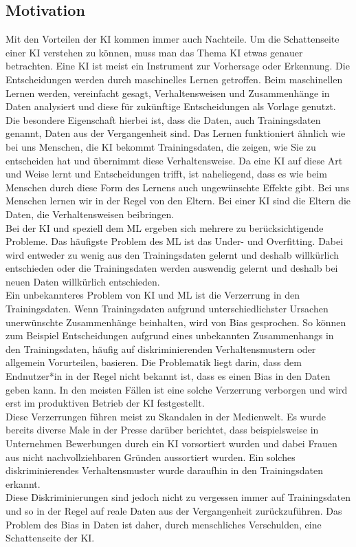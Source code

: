 \begin{onehalfspace}
    \newpage 
    \section{Motivation}
    \label{subsec:motivation}
    Mit den Vorteilen der \ac*{KI} kommen immer auch Nachteile. Um die Schattenseite einer \ac*{KI} verstehen zu können, muss man das Thema \ac*{KI} etwas genauer betrachten. Eine \ac*{KI} ist meist ein Instrument zur Vorhersage oder Erkennung. Die Entscheidungen werden durch maschinelles Lernen getroffen. Beim maschinellen Lernen werden, vereinfacht gesagt, Verhaltensweisen und Zusammenhänge in Daten analysiert und diese für zukünftige Entscheidungen als Vorlage genutzt. Die besondere Eigenschaft hierbei ist, dass die Daten, auch Trainingsdaten genannt, Daten aus der Vergangenheit sind. Das Lernen funktioniert ähnlich wie bei uns Menschen, die \ac*{KI} bekommt Trainingsdaten, die zeigen, wie Sie zu entscheiden hat und übernimmt diese Verhaltensweise. Da eine \ac*{KI} auf diese Art und Weise lernt und Entscheidungen trifft, ist naheliegend, dass es wie beim Menschen durch diese Form des Lernens auch ungewünschte Effekte gibt. Bei uns Menschen lernen wir in der Regel von den Eltern. Bei einer \ac*{KI} sind die Eltern die Daten, die Verhaltensweisen beibringen.\cite{Döbel2018}
        \\
        Bei der \ac*{KI} und speziell dem \ac{ML} ergeben sich mehrere zu berücksichtigende Probleme. Das häufigste Problem des \ac*{ML} ist das Under- und Overfitting. Dabei wird entweder zu wenig aus den Trainingsdaten gelernt und deshalb willkürlich entschieden oder die Trainingsdaten werden \glqq{}auswendig\grqq{} gelernt und deshalb bei neuen Daten willkürlich entschieden.\cite{Horn2022}
        \\
        Ein unbekannteres Problem von \ac*{KI} und \ac*{ML} ist die Verzerrung in den Trainingsdaten. Wenn Trainingsdaten aufgrund unterschiedlichster Ursachen unerwünschte Zusammenhänge beinhalten, wird von Bias gesprochen. So können zum Beispiel Entscheidungen aufgrund eines unbekannten Zusammenhangs in den Trainingsdaten, häufig auf diskriminierenden Verhaltensmustern oder allgemein Vorurteilen, basieren. Die Problematik liegt darin, dass dem Endnutzer*in in der Regel nicht bekannt ist, dass es einen Bias in den Daten geben kann. In den meisten Fällen ist eine solche Verzerrung verborgen und wird erst im produktiven Betrieb der \ac*{KI} festgestellt.\cite{Horn2022}
        \\
        Diese Verzerrungen führen meist zu Skandalen in der Medienwelt. Es wurde bereits diverse Male in der Presse darüber berichtet, dass beispielsweise in Unternehmen Bewerbungen durch ein \ac*{KI} vorsortiert wurden und dabei Frauen aus nicht nachvollziehbaren Gründen aussortiert wurden. Ein solches diskriminierendes Verhaltensmuster wurde daraufhin in den Trainingsdaten erkannt.\cite{IncidentDatabase2015_37}
        \\
        Diese Diskriminierungen sind jedoch nicht zu vergessen immer auf Trainingsdaten und so in der Regel auf reale Daten aus der Vergangenheit zurückzuführen. Das Problem des Bias in Daten ist daher, durch menschliches Verschulden, eine Schattenseite der \ac*{KI}. 


\end{onehalfspace}
